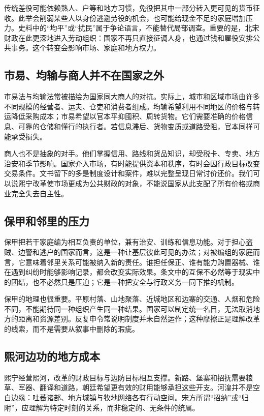 传统差役可能依赖熟人、户等和地方习惯，免役把其中一部分转入更可见的货币征收。此举会削弱某些人以身份逃避劳役的机会，也可能给现金不足的家庭增加压力。史料中的“均平”或“扰民”属于争论语言，不能替代局部调查。重要的是，北宋财政在此更深地进入劳动组织：国家不再只直接征调人身，也通过钱和雇役安排公共事务。这个转变会影响市场、家庭和地方权力。

\subsection{市易、均输与商人并不在国家之外}

市易法与均输法常被描绘为国家同大商人的对抗。实际上，城市和区域市场由许多不同规模的经营者、运夫、仓吏和消费者组成。均输希望利用不同地区的价格与转运降低采购成本；市易希望以官本平抑囤积、周转货物。它们需要准确的价格信息、可靠的仓储和懂行的执行者。若信息滞后、货物变质或道路受阻，官本同样可能承受损失。

商人也不是抽象的对手。他们掌握信用、路线和货品知识，却受税卡、专卖、地方治安和季节影响。国家介入市场，有时能提供资本和秩序，有时会因行政目标改变交易条件。文书留下的多是制度设计和案件，难以完整呈现日常讨价还价。我们可以说熙宁改革使市场更成为公共财政的对象，不能说国家从此支配了所有价格或商业完全失去自主性。

\subsection{保甲和邻里的压力}

保甲把若干家庭编为相互负责的单位，兼有治安、训练和信息功能。对于担心盗贼、边警和逃户的国家而言，这是一种让基层彼此可见的办法；对被编组的家庭而言，它意味着邻里关系可能被纳入新的责任。谁担任保正、谁有能力购置器械、谁在遇到纠纷时能够影响记录，都会改变实际效果。条文中的互保不必然等于现实中的团结，也不必然只是压迫；它是一种把安全与行政义务一同下推的机制。

保甲的地理也很重要。平原村落、山地聚落、近城地区和边寨的交通、人烟和危险不同，不能期待同一种组织产生同一种结果。国家可以制定统一名目，无法取消地方的距离和资源差别。反复申令常说明制度并未自然运作；这种摩擦正是理解改革的线索，而不是需要从叙事中删除的瑕疵。

\subsection{熙河边功的地方成本}

熙宁经营熙河，改革的财政目标与边防目标相互支撑。新路、堡寨和招抚需要粮草、军器、翻译和道路，朝廷希望更有效的财用能够承担这些开支。河湟并不是空白边缘：吐蕃诸部、地方城镇与牧地网络各有行动空间。宋方所谓“招纳”或“归附”，应理解为特定时刻的关系，而非稳定的、无条件的统属。

